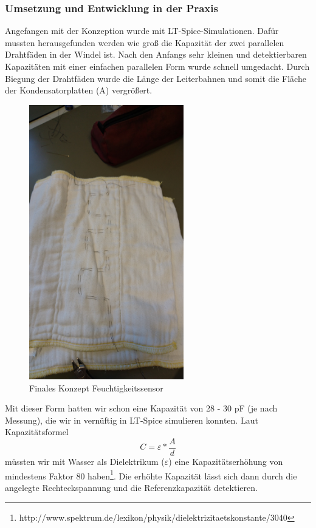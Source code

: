 \subsubsection{Umsetzung und Entwicklung in der Praxis}
Angefangen mit der Konzeption wurde mit LT-Spice-Simulationen. Dafür mussten herausgefunden werden wie groß die Kapazität der zwei parallelen Drahtfäden in der Windel ist. Nach den Anfangs sehr kleinen und detektierbaren Kapazitäten mit einer einfachen parallelen Form wurde schnell umgedacht. Durch Biegung der Drahtfäden wurde die Länge der Leiterbahnen und somit die Fläche der Kondensatorplatten (A) vergrößert.

\begin{figure}[ht]
	\centering
		\includegraphics[width=0.6\textwidth]{includes/kom/graphics/cap_sensor_final}
	\caption{Finales Konzept Feuchtigkeitssensor}
	\label{fig:cap_sensor_final}
\end{figure}

Mit dieser Form hatten wir schon eine Kapazität von 28 - 30 pF (je nach Messung), die wir in vernüftig in LT-Spice simulieren konnten. Laut Kapazitätsformel 
\[C =  \varepsilon * \frac{A}{d}\]
müssten wir mit Wasser als Dielektrikum ($\varepsilon$) eine Kapazitätserhöhung von mindestens Faktor 80 haben\footnote{http://www.spektrum.de/lexikon/physik/dielektrizitaetskonstante/3040}. Die erhöhte Kapazität lässt sich dann durch die angelegte Rechteckspannung und die Referenzkapazität detektieren.


